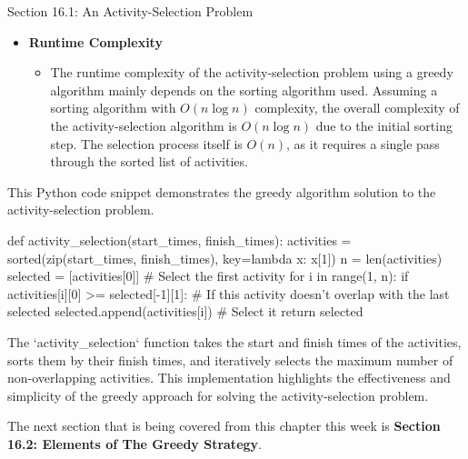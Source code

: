 \begin{notes}{Section 16.1: An Activity-Selection Problem}
\begin{itemize}
        \item \textbf{Runtime Complexity}
        \begin{itemize}
            \item The runtime complexity of the activity-selection problem using a greedy algorithm mainly depends on the sorting algorithm used. Assuming a sorting algorithm with $O(n \log n)$ complexity, 
            the overall complexity of the activity-selection algorithm is $O(n \log n)$ due to the initial sorting step. The selection process itself is $O(n)$, as it requires a single pass through 
            the sorted list of activities.
        \end{itemize}
    \end{itemize}
    
    \begin{highlight}
        This Python code snippet demonstrates the greedy algorithm solution to the activity-selection problem.
    \begin{code}[Python]
    def activity_selection(start_times, finish_times):
        activities = sorted(zip(start_times, finish_times), key=lambda x: x[1])
        n = len(activities)
        selected = [activities[0]]  # Select the first activity
        for i in range(1, n):
            if activities[i][0] >= selected[-1][1]:  # If this activity doesn't overlap with the last selected
                selected.append(activities[i])  # Select it
        return selected
    \end{code}
        The `activity\_selection` function takes the start and finish times of the activities, sorts them by their finish times, and iteratively selects the maximum number of non-overlapping activities. 
        This implementation highlights the effectiveness and simplicity of the greedy approach for solving the activity-selection problem.
    \end{highlight}
\end{notes}

The next section that is being covered from this chapter this week is \textbf{Section 16.2: Elements of The Greedy Strategy}.

